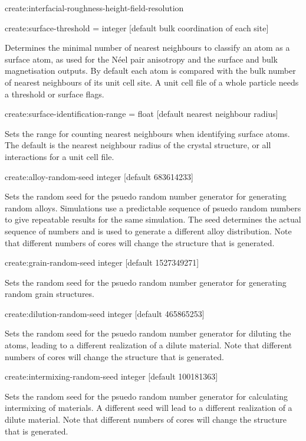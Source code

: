 {\zicf create:interfacial-roughness-height-field-resolution}

{\zicf create:surface-threshold = integer [default bulk coordination of each site]} Determines the minimal number of nearest neighbours to classify an atom as a surface atom, as used for the N\'eel pair anisotropy and the surface and bulk magnetisation outputs. By default each atom is compared with the bulk number of nearest neighbours of its unit cell site. A unit cell file of a whole particle needs a threshold or surface flags.

{\zicf create:surface-identification-range = float [default nearest neighbour radius]} Sets the range for counting nearest neighbours when identifying surface atoms. The default is the nearest neighbour radius of the crystal structure, or all interactions for a unit cell file.

{\zicf create:alloy-random-seed integer [default 683614233]} Sets the random seed for the psuedo random number generator for generating random alloys. Simulations use a predictable sequence of psuedo random numbers to give repeatable results for the same simulation. The seed determines the actual sequence of numbers and is used to generate a different alloy distribution. Note that different numbers of cores will change the structure that is generated.

{\zicf create:grain-random-seed integer [default 1527349271]} Sets the random seed for the psuedo random number generator for generating random grain structures.

{\zicf create:dilution-random-seed integer [default 465865253]} Sets the random seed for the psuedo random number generator for diluting the atoms, leading to a different realization of a dilute material. Note that different numbers of cores will change the structure that is generated.

{\zicf create:intermixing-random-seed integer [default 100181363]} Sets the random seed for the psuedo random number generator for calculating intermixing of materials. A different seed will lead to a different realization of a dilute material. Note that different numbers of cores will change the structure that is generated.

